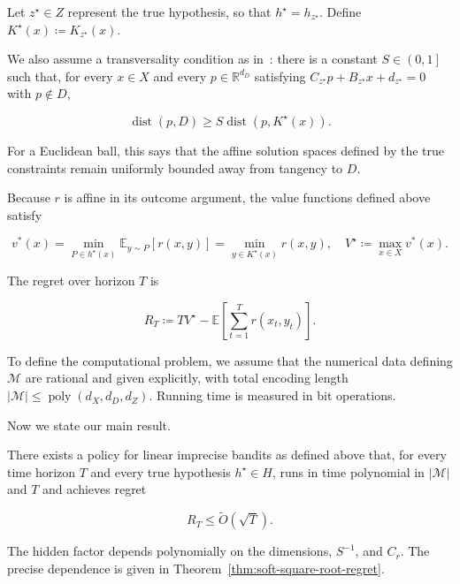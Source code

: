 Let $z^{\star} \in Z$ represent the true
hypothesis, so that $h^{\star} = h_{z^{\star}}$. Define
$K^{\star} \left( x \right) \coloneqq K_{z^{\star}} \left( x \right)$.

We also assume a transversality condition as in~\citep{kosoy2025imprecise}: there is a constant
$S \in \left( 0 , 1 \right]$ such that, for every $x \in X$ and every
$p \in \mathbb{R}^{d_{D}}$ satisfying
$C_{z^{\star}} p + B_{z^{\star}} x + d_{z^{\star}} = 0$ with $p \notin D$,


\begin{equation*}
\operatorname{dist} \left( p , D \right) \ge S \operatorname{dist} \left( p , K^{\star} \left( x \right) \right) .
\end{equation*}


For a Euclidean ball, this says that the affine solution spaces defined by
the true constraints remain uniformly bounded away from tangency to $D$.

Because $r$ is affine in its outcome argument, the value functions defined
above satisfy


\begin{equation*}
v^{\ast} \left( x \right) = \operatorname*{min}_{P \in h^{\star} \left( x \right)} \mathbb{E}_{y \sim P} \left[ r \left( x , y \right) \right] = \operatorname*{min}_{y \in K^{\star} \left( x \right)} r \left( x , y \right) , \quad V^{\star} \coloneqq \operatorname*{max}_{x \in X} v^{\ast} \left( x \right) .
\end{equation*}


The regret over horizon $T$ is


\begin{equation*}
R_{T} \coloneqq T V^{\star} - \mathbb{E} \left[ \sum_{t = 1}^{T} r \left( x_{t} , y_{t} \right) \right] .
\end{equation*}


To define the computational problem, we assume that the numerical data defining $\mathcal{M}$ are rational and
given explicitly, with total encoding length
$|\mathcal{M}|\le\operatorname{poly}(d_X,d_D,d_Z)$.
Running time is measured in bit operations.

Now we state our main result.

\begin{theorem}\label{thm:efficient-upper-bound}
There exists a policy for linear imprecise bandits as defined above that,
  for every time horizon $T$ and every true hypothesis $h^{\star} \in H$,
  runs in time polynomial in $| \mathcal{M} |$ and $T$ and achieves regret

  
\begin{equation*}
R_{T} \le \tilde{O} \left( \sqrt{T} \right) .
\end{equation*}


  The hidden factor depends polynomially on the dimensions, $S^{- 1}$,
  and $C_{r}$. The precise dependence is given in
  Theorem~\ref{thm:soft-square-root-regret}.

\end{theorem}


